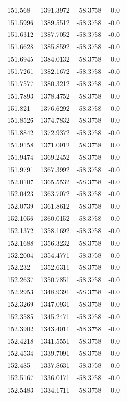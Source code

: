 \begin{table}[H]
\begin{tabular}{llll}
151.568 & 1391.3972 & -58.3758 & -0.0 \\
151.5996 & 1389.5512 & -58.3758 & -0.0 \\
151.6312 & 1387.7052 & -58.3758 & -0.0 \\
151.6628 & 1385.8592 & -58.3758 & -0.0 \\
151.6945 & 1384.0132 & -58.3758 & -0.0 \\
151.7261 & 1382.1672 & -58.3758 & -0.0 \\
151.7577 & 1380.3212 & -58.3758 & -0.0 \\
151.7893 & 1378.4752 & -58.3758 & -0.0 \\
151.821 & 1376.6292 & -58.3758 & -0.0 \\
151.8526 & 1374.7832 & -58.3758 & -0.0 \\
151.8842 & 1372.9372 & -58.3758 & -0.0 \\
151.9158 & 1371.0912 & -58.3758 & -0.0 \\
151.9474 & 1369.2452 & -58.3758 & -0.0 \\
151.9791 & 1367.3992 & -58.3758 & -0.0 \\
152.0107 & 1365.5532 & -58.3758 & -0.0 \\
152.0423 & 1363.7072 & -58.3758 & -0.0 \\
152.0739 & 1361.8612 & -58.3758 & -0.0 \\
152.1056 & 1360.0152 & -58.3758 & -0.0 \\
152.1372 & 1358.1692 & -58.3758 & -0.0 \\
152.1688 & 1356.3232 & -58.3758 & -0.0 \\
152.2004 & 1354.4771 & -58.3758 & -0.0 \\
152.232 & 1352.6311 & -58.3758 & -0.0 \\
152.2637 & 1350.7851 & -58.3758 & -0.0 \\
152.2953 & 1348.9391 & -58.3758 & -0.0 \\
152.3269 & 1347.0931 & -58.3758 & -0.0 \\
152.3585 & 1345.2471 & -58.3758 & -0.0 \\
152.3902 & 1343.4011 & -58.3758 & -0.0 \\
152.4218 & 1341.5551 & -58.3758 & -0.0 \\
152.4534 & 1339.7091 & -58.3758 & -0.0 \\
152.485 & 1337.8631 & -58.3758 & -0.0 \\
152.5167 & 1336.0171 & -58.3758 & -0.0 \\
152.5483 & 1334.1711 & -58.3758 & -0.0 \\

\end{tabular}
\end{table}
